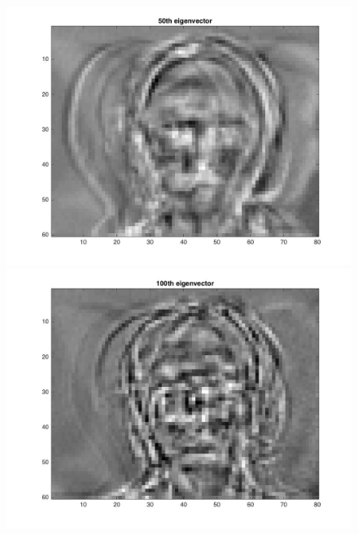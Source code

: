 \documentclass{article}
\begin{document}
\begin{figure}[H]
\includegraphics[scale =.5]{report7_5}
\includegraphics[scale =.5]{report7_6}
\end{figure}

\begin{figure}[H]


\end{figure}

\begin{figure}[H]
\end{figure}
\end{document}
